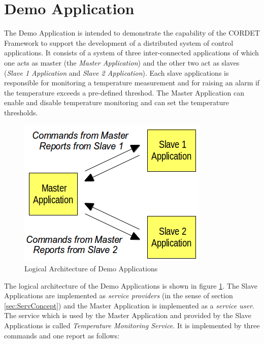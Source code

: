\documentclass[a4paper,10pt]{article}
\let\stdsection\section
\renewcommand\section{\newpage\stdsection}
\begin{document}
\section{Demo Application}\label{sec:DemoApp}

The Demo Application is intended to demonstrate the capability of the CORDET Framework to support the development of a distributed system of control applications. It consists of a system of three inter-connected applications of which one acts as master (the \textit{Master Application}) and the other two act as slaves (\textit{Slave 1 Application} and \textit{Slave 2 Application}). Each slave applications is responsible for monitoring a temperature measurement and for raising an alarm if the temperature exceeds a pre-defined threshod. The Master Application can enable and disable temperature monitoring and can set the temperature thresholds.

\begin{figure}[H]
 \centering
 \includegraphics[scale=0.40,keepaspectratio=true]{DA_LogicalLinks.png}
 \caption{Logical Architecture of Demo Applications}
 \label{fig:DA_LogicalLinks}
\end{figure}

The logical architecture of the Demo Applications is shown in figure \ref{fig:DA_LogicalLinks}. The Slave Applications are implemented as \textit{service providers} (in the sense of section \ref{sec:ServConcept}) and the Master Application is implemented as a \textit{service user}. The service which is used by the Master Application and provided by the Slave Applications is called \textit{Temperature Monitoring Service}. It is implemented by three commands and one report as follows:
\end{document}
